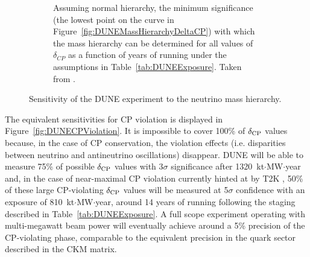 \begin{figure}
\begin{subfigure}[t]{\linewidth}
    \caption{Assuming normal hierarchy, the minimum significance (the lowest point on the curve in Figure~\ref{fig:DUNEMassHierarchyDeltaCP}) with which the mass hierarchy can be determined for all values of $\delta_{CP}$ as a function of years of running under the assumptions in Table~\ref{tab:DUNEExposure}.  Taken from \cite{DUNECDR1}.}
    \label{fig:DUNEMassHierarchyTime}
  \end{subfigure}
  \caption[Sensitivity of the DUNE experiment to the neutrino mass hierarchy.]{Sensitivity of the DUNE experiment to the neutrino mass hierarchy.}
  \label{fig:DUNEMassHierarchy}
\end{figure}

The equivalent sensitivities for CP violation is displayed in Figure~\ref{fig:DUNECPViolation}.  It is impossible to cover 100\% of $\delta_{\textnormal{CP}}$ values because, in the case of CP conservation, the violation effects (i.e. disparities between neutrino and antineutrino oscillations) disappear.  DUNE will be able to measure 75\% of possible $\delta_{\textnormal{CP}}$ values with 3$\sigma$ significance after 1320~kt$\cdot$MW$\cdot$year and, in the case of near-maximal CP violation currently hinted at by T2K \cite{T2K2017}, 50\% of these large CP-violating $\delta_{\textnormal{CP}}$ values will be measured at 5$\sigma$ confidence with an exposure of 810~kt$\cdot$MW$\cdot$year, around 14 years of running following the staging described in Table~\ref{tab:DUNEExposure}.  A full scope experiment operating with multi-megawatt beam power will eventually achieve around a 5\% precision of the CP-violating phase, comparable to the equivalent precision in the quark sector described in the CKM matrix.

